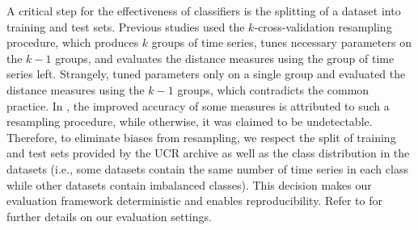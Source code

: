 \documentclass[11pt]{article}
\begin{document}
A critical step for the effectiveness of classifiers is the splitting of a dataset into training and test sets. Previous studies \cite{ding2008querying,wang2013experimental,bagnall2017great} used the $k$-cross-validation resampling procedure, which produces $k$ groups of time series, tunes necessary parameters on the $k-1$ groups, and evaluates the distance measures using the group of time series left. Strangely, \cite{ding2008querying,wang2013experimental} tuned parameters only on a single group and evaluated the distance measures using the $k-1$ groups, which contradicts the common practice. In \cite{bagnall2017great}, the improved accuracy of some measures is attributed to such a resampling procedure, while otherwise, it was claimed to be undetectable. Therefore, to eliminate biases from resampling, we respect the split of training and test sets provided by the UCR archive as well as the class distribution in the datasets (i.e., some datasets contain the same number of time series in each class while other datasets contain imbalanced classes). This decision makes our evaluation framework deterministic and enables reproducibility. Refer to \cite{paparrizos2020debunking}  for further details on our evaluation settings.

\end{document}

